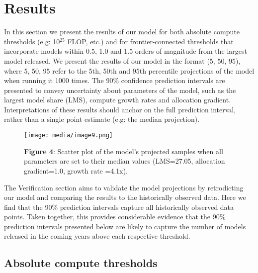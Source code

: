 \documentclass[11pt]{article}
\begin{document}
\section{Results}
\label{results}

In this section we present the results of our model for both absolute compute thresholds (e.g: 10$^{25}$ FLOP, etc.) and for frontier-connected thresholds that incorporate models within 0.5, 1.0 and 1.5 orders of magnitude from the largest model released. We present the results of our model in the format (5, 50, 95), where 5, 50, 95 refer to the 5th, 50th and 95th percentile projections of the model when running it 1000 times. The 90\% confidence prediction intervals are presented to convey uncertainty about parameters of the model, such as the largest model share (LMS), compute growth rates and allocation gradient. Interpretations of these results should anchor on the full prediction interval, rather than a single point estimate (e.g: the median projection).

\begin{figure}[h]
\centering
\texttt{[image: media/image9.png]}
\caption*{\textbf{Figure 4}: Scatter plot of the model's projected samples when all parameters are set to their median values (LMS=27.05, allocation gradient=1.0, growth rate =4.1x).}
\label{fig:model-projections}
\end{figure}

The Verification section aims to validate the model projections by retrodicting our model and comparing the results to the historically observed data. Here we find that the 90\% prediction intervals capture all historically observed data points. Taken together, this provides considerable evidence that the 90\% prediction intervals presented below are likely to capture the number of models released in the coming years above each respective threshold.

\subsection{Absolute compute thresholds}
\end{document}
